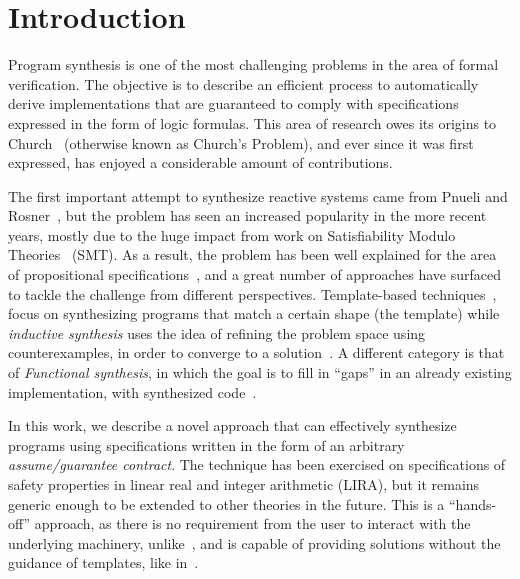 
\section{Introduction}

Program synthesis is one of the most challenging problems in the area of formal verification. The objective is to describe an efficient process to automatically derive implementations that are guaranteed to comply with specifications expressed in the form of logic formulas. This area of research owes its origins to Church~\cite{church1962logic} (otherwise known as Church's Problem), and ever since it was first expressed, has enjoyed a considerable amount of contributions.

The first important attempt to synthesize reactive systems came from Pnueli and Rosner~\cite{pnueli1989synthesis}, but the problem has seen an increased popularity in the more recent years, mostly due to the huge impact from work on Satisfiability Modulo Theories~\cite{BarFT-SMTLIB} (SMT). As a result, the problem has been well explained for the area of propositional specifications~\cite{gulwani2010dimensions}, and a great number of approaches have surfaced to tackle the challenge from different perspectives. Template-based techniques~\cite{srivastava2013template}, focus on synthesizing programs that
match a certain shape (the template) while {\em inductive synthesis} uses the idea of refining the problem space using counterexamples, in order to converge to a solution~\cite{flener2001inductive}. A different category is that of \textit{Functional synthesis}, in which the goal is to fill in ``gaps'' in an already existing implementation, with synthesized code~\cite{kuncak2013functional}.

In this work, we describe a novel approach that can effectively synthesize
programs using specifications written in the form of an arbitrary {\em
assume/guarantee contract}. The technique has been exercised on specifications
of safety properties in linear real and integer arithmetic (LIRA),
but it remains generic enough to be extended to other theories
in the future. This is a ``hands-off'' approach, as there is no
requirement from the user to interact with the underlying machinery,
unlike~\cite{ryzhyk2014user,ryzhyk2016developing}, and is capable of providing solutions without the guidance of templates, like
in~\cite{beyene2014constraint}.

